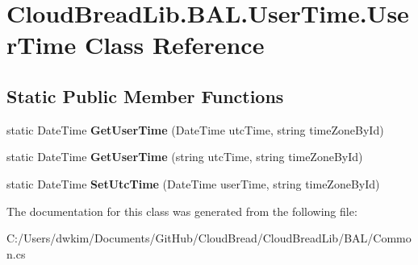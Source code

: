 \hypertarget{class_cloud_bread_lib_1_1_b_a_l_1_1_user_time_1_1_user_time}{}\section{Cloud\+Bread\+Lib.\+B\+A\+L.\+User\+Time.\+User\+Time Class Reference}
\label{class_cloud_bread_lib_1_1_b_a_l_1_1_user_time_1_1_user_time}
\subsection*{Static Public Member Functions}
\begin{DoxyCompactItemize}
\item 
static Date\+Time {\bfseries Get\+User\+Time} (Date\+Time utc\+Time, string time\+Zone\+By\+Id)\hypertarget{class_cloud_bread_lib_1_1_b_a_l_1_1_user_time_1_1_user_time_a6006f411b78e71aa7913cb0e4c209394}{}\label{class_cloud_bread_lib_1_1_b_a_l_1_1_user_time_1_1_user_time_a6006f411b78e71aa7913cb0e4c209394}

\item 
static Date\+Time {\bfseries Get\+User\+Time} (string utc\+Time, string time\+Zone\+By\+Id)\hypertarget{class_cloud_bread_lib_1_1_b_a_l_1_1_user_time_1_1_user_time_aefb05ddf31260b7f632f1f33c1125287}{}\label{class_cloud_bread_lib_1_1_b_a_l_1_1_user_time_1_1_user_time_aefb05ddf31260b7f632f1f33c1125287}

\item 
static Date\+Time {\bfseries Set\+Utc\+Time} (Date\+Time user\+Time, string time\+Zone\+By\+Id)\hypertarget{class_cloud_bread_lib_1_1_b_a_l_1_1_user_time_1_1_user_time_a6859b59a97eb28180aa6cb6babfc08b5}{}\label{class_cloud_bread_lib_1_1_b_a_l_1_1_user_time_1_1_user_time_a6859b59a97eb28180aa6cb6babfc08b5}

\end{DoxyCompactItemize}


The documentation for this class was generated from the following file\+:\begin{DoxyCompactItemize}
\item 
C\+:/\+Users/dwkim/\+Documents/\+Git\+Hub/\+Cloud\+Bread/\+Cloud\+Bread\+Lib/\+B\+A\+L/Common.\+cs\end{DoxyCompactItemize}
